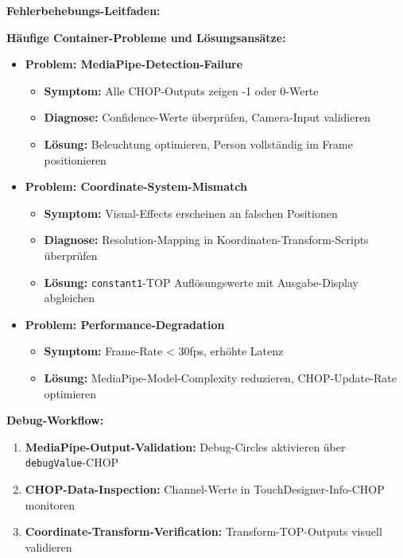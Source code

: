 \textbf{Fehlerbehebungs-Leitfaden:}

\textbf{Häufige Container-Probleme und Lösungsansätze:}

\begin{itemize}
    \item \textbf{Problem: MediaPipe-Detection-Failure}
    \begin{itemize}
        \item \textbf{Symptom:} Alle CHOP-Outputs zeigen -1 oder 0-Werte
        \item \textbf{Diagnose:} Confidence-Werte überprüfen, Camera-Input validieren
        \item \textbf{Lösung:} Beleuchtung optimieren, Person vollständig im Frame positionieren
    \end{itemize}
    
    \item \textbf{Problem: Coordinate-System-Mismatch}
    \begin{itemize}
        \item \textbf{Symptom:} Visual-Effects erscheinen an falschen Positionen
        \item \textbf{Diagnose:} Resolution-Mapping in Koordinaten-Transform-Scripts überprüfen
        \item \textbf{Lösung:} \texttt{constant1}-TOP Auflösungswerte mit Ausgabe-Display abgleichen
    \end{itemize}
    
    \item \textbf{Problem: Performance-Degradation}
    \begin{itemize}
        \item \textbf{Symptom:} Frame-Rate < 30fps, erhöhte Latenz
        \item \textbf{Lösung:} MediaPipe-Model-Complexity reduzieren, CHOP-Update-Rate optimieren
    \end{itemize}
\end{itemize}

\textbf{Debug-Workflow:}
\begin{enumerate}
    \item \textbf{MediaPipe-Output-Validation:} Debug-Circles aktivieren über \texttt{debugValue}-CHOP
    \item \textbf{CHOP-Data-Inspection:} Channel-Werte in TouchDesigner-Info-CHOP monitoren
    \item \textbf{Coordinate-Transform-Verification:} Transform-TOP-Outputs visuell validieren
\end{enumerate}

